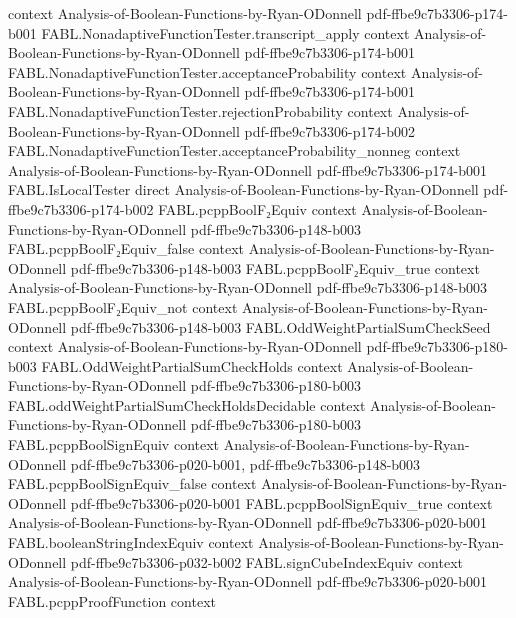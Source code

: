 \begin{theorem}
  {context}
  {Analysis-of-Boolean-Functions-by-Ryan-ODonnell}
  {pdf-ffbe9c7b3306-p174-b001}
\proofstep
  {FABL.NonadaptiveFunctionTester.transcript_apply}
  {context}
  {Analysis-of-Boolean-Functions-by-Ryan-ODonnell}
  {pdf-ffbe9c7b3306-p174-b001}
\proofstep
  {FABL.NonadaptiveFunctionTester.acceptanceProbability}
  {context}
  {Analysis-of-Boolean-Functions-by-Ryan-ODonnell}
  {pdf-ffbe9c7b3306-p174-b001}
\proofstep
  {FABL.NonadaptiveFunctionTester.rejectionProbability}
  {context}
  {Analysis-of-Boolean-Functions-by-Ryan-ODonnell}
  {pdf-ffbe9c7b3306-p174-b002}
\proofstep
  {FABL.NonadaptiveFunctionTester.acceptanceProbability_nonneg}
  {context}
  {Analysis-of-Boolean-Functions-by-Ryan-ODonnell}
  {pdf-ffbe9c7b3306-p174-b001}
\proofstep
  {FABL.IsLocalTester}
  {direct}
  {Analysis-of-Boolean-Functions-by-Ryan-ODonnell}
  {pdf-ffbe9c7b3306-p174-b002}
\proofstep
  {FABL.pcppBoolF₂Equiv}
  {context}
  {Analysis-of-Boolean-Functions-by-Ryan-ODonnell}
  {pdf-ffbe9c7b3306-p148-b003}
\proofstep
  {FABL.pcppBoolF₂Equiv_false}
  {context}
  {Analysis-of-Boolean-Functions-by-Ryan-ODonnell}
  {pdf-ffbe9c7b3306-p148-b003}
\proofstep
  {FABL.pcppBoolF₂Equiv_true}
  {context}
  {Analysis-of-Boolean-Functions-by-Ryan-ODonnell}
  {pdf-ffbe9c7b3306-p148-b003}
\proofstep
  {FABL.pcppBoolF₂Equiv_not}
  {context}
  {Analysis-of-Boolean-Functions-by-Ryan-ODonnell}
  {pdf-ffbe9c7b3306-p148-b003}
\proofstep
  {FABL.OddWeightPartialSumCheckSeed}
  {context}
  {Analysis-of-Boolean-Functions-by-Ryan-ODonnell}
  {pdf-ffbe9c7b3306-p180-b003}
\proofstep
  {FABL.OddWeightPartialSumCheckHolds}
  {context}
  {Analysis-of-Boolean-Functions-by-Ryan-ODonnell}
  {pdf-ffbe9c7b3306-p180-b003}
\proofstep
  {FABL.oddWeightPartialSumCheckHoldsDecidable}
  {context}
  {Analysis-of-Boolean-Functions-by-Ryan-ODonnell}
  {pdf-ffbe9c7b3306-p180-b003}
\proofstep
  {FABL.pcppBoolSignEquiv}
  {context}
  {Analysis-of-Boolean-Functions-by-Ryan-ODonnell}
  {pdf-ffbe9c7b3306-p020-b001,
    pdf-ffbe9c7b3306-p148-b003}
\proofstep
  {FABL.pcppBoolSignEquiv_false}
  {context}
  {Analysis-of-Boolean-Functions-by-Ryan-ODonnell}
  {pdf-ffbe9c7b3306-p020-b001}
\proofstep
  {FABL.pcppBoolSignEquiv_true}
  {context}
  {Analysis-of-Boolean-Functions-by-Ryan-ODonnell}
  {pdf-ffbe9c7b3306-p020-b001}
\proofstep
  {FABL.booleanStringIndexEquiv}
  {context}
  {Analysis-of-Boolean-Functions-by-Ryan-ODonnell}
  {pdf-ffbe9c7b3306-p032-b002}
\proofstep
  {FABL.signCubeIndexEquiv}
  {context}
  {Analysis-of-Boolean-Functions-by-Ryan-ODonnell}
  {pdf-ffbe9c7b3306-p020-b001}
\proofstep
  {FABL.pcppProofFunction}
  {context}

\end{theorem}
